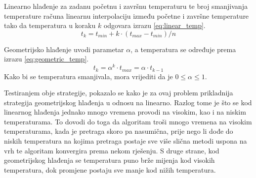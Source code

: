 Linearno hlađenje za zadanu početnu i završnu temperaturu te broj smanjivanja temperature računa linearnu interpolaciju između početne i završne temperature tako da temperatura u koraku $k$ odgovara izrazu \eqref{eq:linear_temp}.
\begin{equation}
\label{eq:linear_temp}
    t_k = t_{min} + k \cdot \left( t_{max} - t_{min} \right) / n
\end{equation}

Geometrijsko hlađenje uvodi parametar $\alpha$, a temperatura se određuje prema izrazu \eqref{eq:geometric_temp}.
\begin{equation}
\label{eq:geometric_temp}
    t_k = \alpha^k \cdot t_{max} = \alpha \cdot t_{k-1}
\end{equation}
Kako bi se temperatura smanjivala, mora vrijediti da je $0 \le \alpha \le 1$.

Testiranjem obje strategije, pokazalo se kako je za ovaj problem prikladnija strategija geometrijskog hlađenja u odnosu na linearno.
Razlog tome je što se kod linearnog hlađenja jednako mnogo vremena provodi na visokim, kao i na niskim temperaturama.
To dovodi do toga da algoritam troši mnogo vremena na visokim temperaturama, kada je pretraga skoro pa nasumična, prije nego li dođe do niskih temperatura na kojima pretraga postaje sve više slična metodi uspona na vrh te algoritam konvergira prema nekom rješenju.
S druge strane, kod geometrijskog hlađenja se temperatura puno brže mijenja kod visokih temperatura, dok promjene postaju sve manje kod nižih temperatura.

